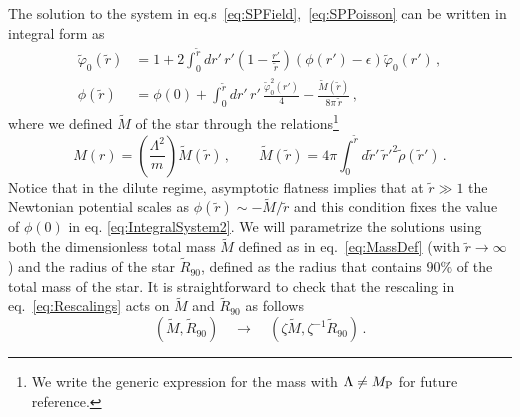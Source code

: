 \documentclass[11pt,a4paper]{article}
\begin{document}
\noindent The solution to the system in eq.s~\eqref{eq:SPField},~\eqref{eq:SPPoisson} can be written in integral form as~\cite{UrenaLopez:2002gx, Guzman:2004wj}
\begin{align}
\label{eq:IntegralSystem1}
\tilde{\varphi}_0(\tilde{r}) & = 1 + 2 \int_0^{\tilde{r}} dr' \, r' \left(1 - \frac{r'}{\tilde{r}}\right) \left(\phi(r') - \epsilon\right) \tilde{\varphi}_0(r') \,, \\
\phi(\tilde{r}) & = \phi(0) + \int_0^{\tilde{r}} dr' \, r' \, \frac{\tilde{\varphi}^2_0(r')}{4} - \frac{\tilde{M}(\tilde{r})}{8 \pi \,\tilde{r}} \,,
\label{eq:IntegralSystem2}
\end{align}
where we defined $\tilde{M}$ of the star through the relations\footnote{We write the generic expression for the mass with $\Lambda \neq M_{\rm P}$ for future reference.}
\begin{equation}
\label{eq:MassDef}
M(r) = \left(\frac{\Lambda^2}{m}\right) \tilde{M}(\tilde{r}) \,, \qquad \tilde{M}(\tilde{r}) = 4 \pi \int_0^{\tilde{r}} d\tilde{r}'\, \tilde{r}'^2 \tilde{\rho}(\tilde{r}') \, .
\end{equation}
Notice that in the dilute regime, asymptotic flatness implies that at $\tilde{r} \gg 1$ the Newtonian potential scales as $\phi(\tilde{r}) \sim -\tilde{M}/\tilde{r}$ and this condition fixes the value of $\phi(0)$ in eq. \eqref{eq:IntegralSystem2}. We will parametrize the solutions using both the dimensionless total mass $\tilde{M}$ defined as in eq.~\eqref{eq:MassDef} (with $\tilde{r} \rightarrow \infty$) and the radius of the star $\tilde{R}_{90}$, defined as the radius that contains $90\%$ of the total mass of the star. It is straightforward to check that the rescaling in eq.~\eqref{eq:Rescalings} acts on $\tilde{M}$ and $\tilde{R}_{90}$ as follows
\begin{equation}
\label{eq:ScalingMassRadius}
\left(\tilde{M}, \tilde{R}_{90}\right) \quad \longrightarrow \quad \left(\zeta \tilde{M}, \zeta^{-1} \tilde{R}_{90}\right) \,.
\end{equation}
\end{document}
